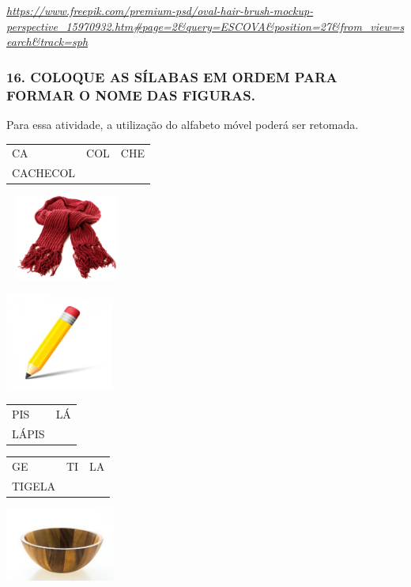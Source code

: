 \href{https://www.freepik.com/premium-psd/oval-hair-brush-mockup-perspective_15970932.htm\#page=2\&query=ESCOVA\&position=27\&from_view=search\&track=sph}{\emph{https://www.freepik.com/premium-psd/oval-hair-brush-mockup-perspective\_15970932.htm\#page=2\&query=ESCOVA\&position=27\&from\_view=search\&track=sph}}

\subsubsection{16. COLOQUE AS SÍLABAS EM ORDEM PARA FORMAR O NOME DAS
FIGURAS.}\label{coloque-as-suxedlabas-em-ordem-para-formar-o-nome-das-figuras.}

Para essa atividade, a utilização do alfabeto móvel poderá ser retomada.

\begin{longtable}[]{@{}lll@{}}
\toprule
CA & COL & CHE\tabularnewline
CACHECOL\tabularnewline
\bottomrule
\end{longtable}

\includegraphics[width=1.59418in,height=1.11488in]{media/image77.png}

\includegraphics[width=1.39583in,height=1.25000in]{media/image78.png}

\begin{longtable}[]{@{}ll@{}}
\toprule
PIS & LÁ\tabularnewline
LÁPIS\tabularnewline
\bottomrule
\end{longtable}

\begin{longtable}[]{@{}lll@{}}
\toprule
GE & TI & LA\tabularnewline
TIGELA\tabularnewline
\bottomrule
\end{longtable}

\includegraphics[width=1.41771in,height=0.94514in]{media/image79.jpg}

